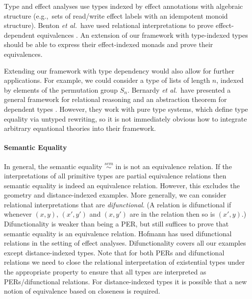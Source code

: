 Type and effect analyses use types indexed by effect annotations with
algebraic structure (e.g.,~sets of read/write effect labels with an
idempotent monoid structure). Benton {\em et al.}~have used relational
interpretations to prove effect-dependent equivalences
\cite{benton06reading}. An extension of our framework with
type-indexed types should be able to express their effect-indexed monads
and prove their equivalences.

Extending our framework with type dependency would also allow for
further applications. For example, we could consider a type of lists
of length $n$, indexed by elements of the permutation group
$S_n$. Bernardy {\em et al.}~have presented a general framework for
relational reasoning and an abstraction theorem for dependent types
\cite{bernardy12proofs}. However, they work with pure type systems,
which define type equality via untyped rewriting, so it is not
immediately obvious how to integrate arbitrary equational theories
into their framework.

\paragraph{Semantic Equality} In general, the semantic equality
$\stackrel{sem}\sim$ in  is not an
equivalence relation. If the interpretations of all 
primitive types are partial equivalence relations then semantic
equality is indeed an equivalence relation. However, this excludes the
geometry and distance-indexed examples. More generally, we can
consider relational interpretations that are \emph{difunctional}. (A
relation is difunctional if whenever $(x,y)$, $(x',y')$ and $(x,y')$
are in the relation then so is $(x',y)$.) Difunctionality is weaker
than being a PER, but still suffices to prove that semantic equality
is an equivalence relation. Hofmann \cite{hofmann08correctness} has
used difunctional relations in the setting of effect
analyses. Difunctionality covers all our examples except
distance-indexed types. Note that for both PERs and difunctional
relations we need to close the relational interpretation of
existential types under the appropriate property to ensure that all
types are interpreted as PERs/difunctional relations. For
distance-indexed types it is possible that a new notion of
equivalence based on closeness is required.

